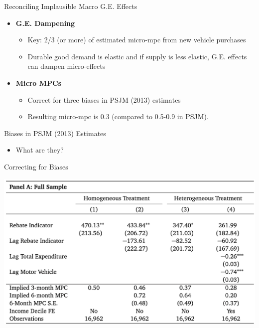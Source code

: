 \documentclass[english,xcolor=svgnames]{beamer}
\begin{document}
\begin{frame}{Reconciling Implausible Macro G.E. Effects}

\begin{itemize}
	\item \textbf{G.E. Dampening}
		\begin{itemize}
		\item Key: 2/3 (or more) of estimated micro-mpc from new vehicle purchases
		\item Durable good demand is elastic and if supply is less elastic, G.E. effects can dampen micro-effects
		\end{itemize}
		
\item \textbf{Micro MPCs}
	\begin{itemize}
		\item Correct for three biases in PSJM (2013) estimates
		\item Resulting micro-mpc is 0.3 (compared to 0.5-0.9 in PSJM).
	\end{itemize}
\end{itemize}

\end{frame}

\begin{frame}{Biases in PSJM (2013) Estimates}
\begin{itemize}
	\item What are they?
\end{itemize}
\end{frame}

\begin{frame}{Correcting for Biases}
	\begin{center}
		\includegraphics[scale=0.4]{figures/ORWTAB3.png}
	 \end{center} 
\end{frame}
\end{document}

